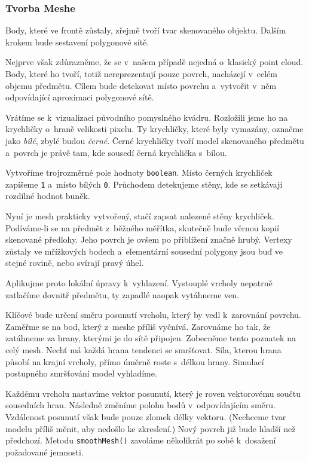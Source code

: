 \documentclass[12pt]{report}			%
\begin{document}
                    \subsubsection{Tvorba Meshe}

                        Body, které ve frontě zůstaly, zřejmě tvoří tvar skenovaného objektu. Dalším krokem bude sestavení polygonové sítě.
    
                        Nejprve však zdůrazněme, že se v~našem případě nejedná o~klasický point cloud. Body, které ho tvoří, totiž nereprezentují pouze povrch, nacházejí v~celém objemu předmětu. Cílem bude detekovat místo povrchu a~vytvořit v~něm odpovídající aproximaci polygonové sítě.
    
    
                        Vrátíme se k~vizualizaci původního pomyslného kvádru. Rozložili jsme ho na krychličky o~hraně velikosti pixelu. Ty krychličky, které byly vymazány, označme jako \emph{bílé}, zbylé budou \emph{černé}. Černé krychličky tvoří model skenovaného předmětu a~povrch je právě tam, kde sousedí černá krychlička s~bílou.
    
                        Vytvoříme trojrozměrné pole hodnoty \verb|boolean|. Místo černých krychliček zapíšeme \verb|1| a~místo bílých \verb|0|. Průchodem detekujeme stěny, kde se setkávají rozdílné hodnot buněk.
    
                        Nyní je mesh prakticky vytvořený, stačí zapsat nalezené stěny krychliček. Podíváme-li se na předmět z~běžného měřítka, skutečně bude věrnou kopií skenované předlohy. Jeho povrch je ovšem po přiblížení značně hrubý. Vertexy zůstaly ve mřížkových bodech a~elementární sousední polygony jsou buď ve stejné rovině, nebo svírají pravý úhel.
    
    
                        Aplikujme proto lokální úpravy k~vyhlazení. Vystouplé vrcholy nepatrně zatlačíme dovnitř předmětu, ty zapadlé naopak vytáhneme ven.
    
                        Klíčové bude určení směru posunutí vrcholu, který by vedl k~zarovnání povrchu. Zaměřme se na bod, který z~meshe příliš vyčnívá. Zarovnáme ho tak, že zatáhneme za hrany, kterými je do sítě připojen. Zobecněme tento poznatek na celý mesh. Nechť má každá hrana tendenci se smršťovat. Síla, kterou hrana působí na krajní vrcholy, přímo úměrně roste s~délkou hrany. Simulací postupného smršťování model vyhladíme.
    
                        Každému vrcholu nastavíme vektor posunutí, který je roven vektorovému součtu sousedních hran. Následně změníme polohu bodů v~odpovídajícím směru. Vzdálenost posunutí však bude pouze zlomek délky vektoru. (Nechceme tvar modelu příliš měnit, aby nedošlo ke zkreslení.) Nový povrch již bude hladší než předchozí. Metodu \verb|smoothMesh()| zavoláme několikrát po sobě k~dosažení požadované jemnosti.
\end{document}
